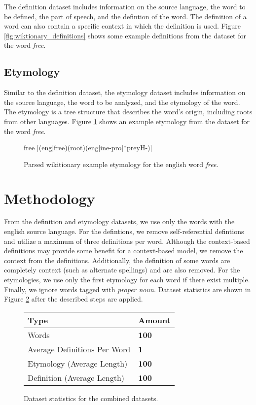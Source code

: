 \documentclass[11pt,a4paper]{article}
\begin{document}
The definition dataset includes information on the source language, the word to
be defined, the part of speech, and the defintion of the word. The definition of
a word can also contain a specific context in which the definition is used.
Figure \ref{fig:wiktionary_definitions} shows some example definitions from the
dataset for the word \textit{free}.

\subsection{Etymology}

Similar to the definition dataset, the etymology dataset includes information on
the source language, the word to be analyzed, and the etymology of the word. The
etymology is a tree structure that describes the word's origin, including roots
from other languages. Figure \ref{fig:wiktionary_etymology} shows an example
etymology from the dataset for the word \textit{free}.

\begin{figure}[h]
  \color{blue}free \color{black}[\color{green}(eng|free)\color{blue}(root)\color{red}(eng|ine-pro|*preyH-)\color{black}]
  \caption{Parsed wikitionary example etymology for the english word
    \textit{free}.}
  \label{fig:wiktionary_etymology}
\end{figure}

\section{Methodology}

From the definition and etymology datasets, we use only the words with the
english source language. For the defintions, we remove self-referential
defintions and utilize a maximum of three definitions per word. Although the
context-based definitions may provide some benefit for a context-based model, we
remove the context from the definitions. Additionally, the definition of some
words are completely context (such as alternate spellings) and are also removed.
For the etymologies, we use only the first etymology for each word if there
exist multiple. Finally, we ignore words tagged with \textit{proper noun}.
Dataset statistics are shown in Figure \ref{fig:dataset_stats} after the
described steps are applied.

\begin{figure}[h]
  \begin{tabular}{|l|l|}
    \hline
    \textbf{Type}                & \textbf{Amount} \\
    \hline\hline
    Words                        & \textbf{100}    \\
    Average Definitions Per Word & \textbf{1}      \\
    Etymology (Average Length)   & \textbf{100}    \\
    Definition (Average Length)  & \textbf{100}    \\
    \hline
  \end{tabular}
  \caption{Dataset statistics for the combined datasets.}
  \label{fig:dataset_stats}
\end{figure}
\end{document}
